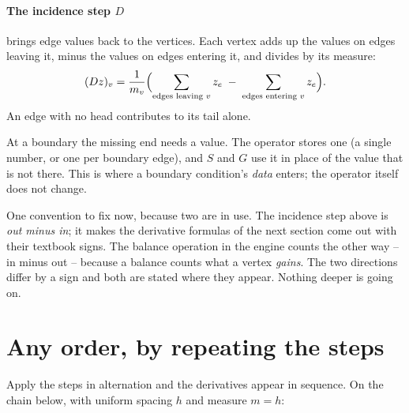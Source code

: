 \documentclass[11pt]{article}
\begin{document}
\paragraph{The incidence step $D$} brings edge values back to the
vertices. Each vertex adds up the values on edges leaving it, minus
the values on edges entering it, and divides by its measure:
\[
(Dz)_v = \frac{1}{m_v}\Bigl(
  \sum_{\text{edges leaving } v} z_e \;-\;
  \sum_{\text{edges entering } v} z_e \Bigr).
\]
An edge with no head contributes to its tail alone.

\begin{center}
\end{center}

At a boundary the missing end needs a value. The operator stores one
(a single number, or one per boundary edge), and $S$ and $G$ use it
in place of the value that is not there. This is where a boundary
condition's \emph{data} enters; the operator itself does not change.

One convention to fix now, because two are in use. The incidence
step above is
\emph{out minus in}; it makes the derivative formulas of the next
section come out with their textbook signs. The balance operation in
the engine counts the other way -- in minus out -- because a balance
counts what a vertex \emph{gains}. The two directions differ by a sign and
both are stated where they appear. Nothing deeper is going on.

\section{Any order, by repeating the steps}\label{sec:orders}

Apply the steps in alternation and the derivatives appear in
sequence. On the chain below, with uniform spacing $h$ and measure
$m = h$:
\end{document}

